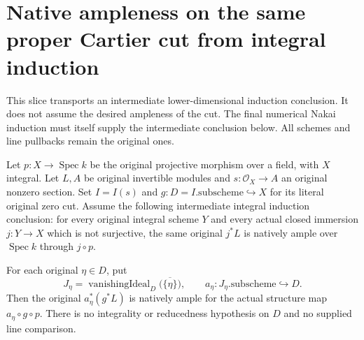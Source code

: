 \section{Native ampleness on the same proper Cartier cut from integral induction}

This slice transports an intermediate lower-dimensional induction conclusion.
It does not assume the desired ampleness of the cut. The final numerical
Nakai induction must itself supply the intermediate conclusion below.
All schemes and line pullbacks remain the original ones.

\begin{lemma}
\label{lem:seshadri-original-proper-cut-strata-ample}
\leanok
{}
Let $p:X\to\operatorname{Spec}k$ be the original projective morphism over
a field, with $X$ integral. Let $L,A$ be original invertible modules and
$s:\mathcal O_X\to A$ an original nonzero section. Set $I=I(s)$ and
$g:D=I.\mathrm{subscheme}\hookrightarrow X$ for its literal original zero cut.
Assume the following intermediate integral induction conclusion: for every
original integral scheme $Y$ and every actual closed immersion $j:Y\to X$
which is not surjective, the same original $j^*L$ is natively ample over
$\operatorname{Spec}k$ through $j\circ p$.

For each original $\eta\in D$, put
\[
 J_\eta=\operatorname{vanishingIdeal}_D
     \bigl(\overline{\{\eta\}}\bigr),\qquad
 a_\eta:J_\eta.\mathrm{subscheme}\hookrightarrow D.
\]
Then the original $a_\eta^*(g^*L)$ is natively ample for the actual
structure map $a_\eta\circ g\circ p$. There is no integrality or
reducedness hypothesis on $D$ and no supplied line comparison.
\end{lemma}
